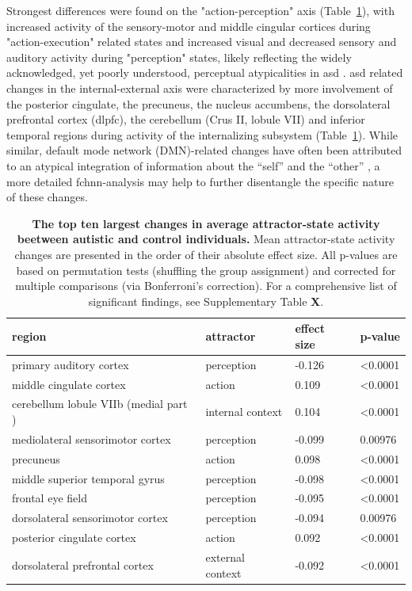 \documentclass{article}
\begin{document}
Strongest differences were found on the "action-perception" axis (Table~\ref{tab-clinical-results}), with increased activity of the sensory-motor and mid\acrshort{dl}e cingular cortices during "action-execution" related states and increased visual and decreased sensory and auditory activity during "perception" states, likely reflecting the widely acknowledged, yet poorly understood, perceptual atypicalities in \acrshort{asd} \citep{hadad2019perception}.
\acrshort{asd} related changes in the internal-external axis were characterized by more involvement of the posterior cingulate, the precuneus, the nucleus accumbens, the dorsolateral prefrontal cortex (\acrshort{dl}\acrshort{pfc}), the cerebellum (Crus II, lobule VII) and inferior temporal regions during activity of the internalizing subsystem (Table~\ref{tab-clinical-results}). While similar, default mode network (DMN)-related changes have often been attributed to an atypical integration of information about the ``self'' and the ``other'' \citep{padmanabhan2017default}, a more detailed \acrshort{fchnn}-analysis may help to further disentangle the specific nature of these changes.

\begin{table}
\centering
\caption[]{\textbf{The top ten largest changes in average attractor-state activity beetween autistic and control individuals.}  Mean attractor-state activity changes are presented in the order of their absolute effect size. All p-values are based on permutation tests (shuffling the group assignment) and corrected for multiple comparisons (via Bonferroni's correction). For a comprehensive list of significant findings, see Supplementary Table \textbf{X}.}
\label{tab-clinical-results}
\begin{tabular}{p{}p{}p{}p{}}
\toprule
region & attractor & effect size & p-value \\
\hline
primary auditory cortex & perception & -0.126 & \textless 0.0001 \\
mid\acrshort{dl}e cingulate cortex & action & 0.109 & \textless 0.0001 \\
cerebellum lobule VIIb (medial part  ) & internal context & 0.104 & \textless 0.0001 \\
mediolateral sensorimotor cortex & perception & -0.099 & 0.00976 \\
precuneus & action & 0.098 & \textless 0.0001 \\
mid\acrshort{dl}e superior temporal gyrus & perception & -0.098 & \textless 0.0001 \\
frontal eye field & perception & -0.095 & \textless 0.0001 \\
dorsolateral sensorimotor cortex & perception & -0.094 & 0.00976 \\
posterior cingulate cortex & action & 0.092 & \textless 0.0001 \\
dorsolateral prefrontal cortex & external context & -0.092 & \textless 0.0001 \\
\bottomrule
\end{tabular}
\end{table}
\end{document}
